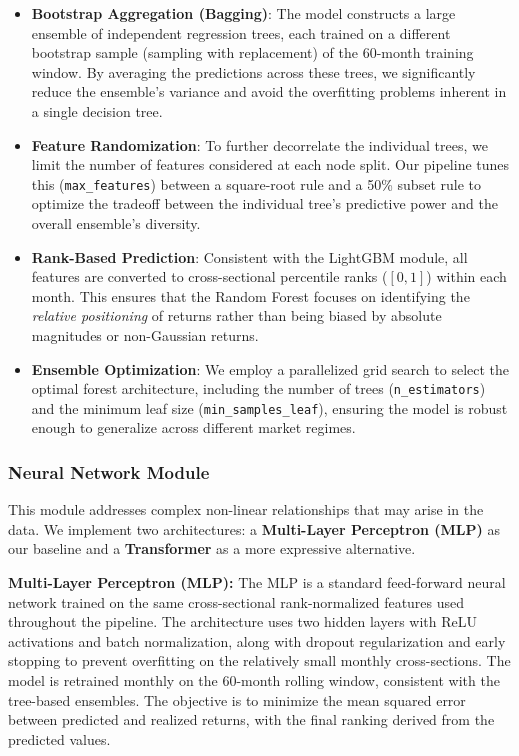 \documentclass[11pt]{article}
\begin{document}
\begin{itemize}
    \item \textbf{Bootstrap Aggregation (Bagging)}: The model constructs a large ensemble of independent regression trees, each trained on a different bootstrap sample (sampling with replacement) of the 60-month training window. By averaging the predictions across these trees, we significantly reduce the ensemble's variance and avoid the overfitting problems inherent in a single decision tree.
    \item \textbf{Feature Randomization}: To further decorrelate the individual trees, we limit the number of features considered at each node split. Our pipeline tunes this (\texttt{max\_features}) between a square-root rule and a 50\% subset rule to optimize the tradeoff between the individual tree's predictive power and the overall ensemble's diversity.
    \item \textbf{Rank-Based Prediction}: Consistent with the LightGBM module, all features are converted to cross-sectional percentile ranks ($[0,1]$) within each month. This ensures that the Random Forest focuses on identifying the \textit{relative positioning} of returns rather than being biased by absolute magnitudes or non-Gaussian returns.
    \item \textbf{Ensemble Optimization}: We employ a parallelized grid search to select the optimal forest architecture, including the number of trees (\texttt{n\_estimators}) and the minimum leaf size (\texttt{min\_samples\_leaf}), ensuring the model is robust enough to generalize across different market regimes.
\end{itemize}
\subsubsection{Neural Network Module}
This module addresses complex non-linear relationships that may arise in the data. We implement two architectures: a \textbf{Multi-Layer Perceptron (MLP)} as our baseline and a \textbf{Transformer} as a more expressive alternative.

\textbf{Multi-Layer Perceptron (MLP):} The MLP is a standard feed-forward neural network trained on the same cross-sectional rank-normalized features used throughout the pipeline. The architecture uses two hidden layers with ReLU activations and batch normalization, along with dropout regularization and early stopping to prevent overfitting on the relatively small monthly cross-sections. The model is retrained monthly on the 60-month rolling window, consistent with the tree-based ensembles. The objective is to minimize the mean squared error between predicted and realized returns, with the final ranking derived from the predicted values.
\end{document}
